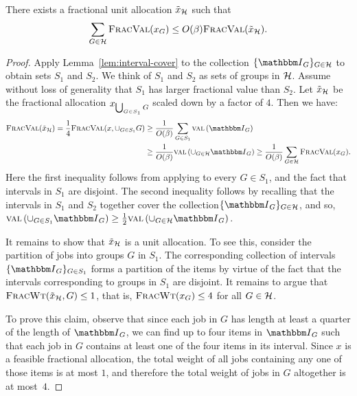 \begin{lemma}
  \label{lem:heavy-bound}
  There exists a fractional unit allocation $\tilde{x}_{\mathcal{H}}$ such that 
\[\sum_{G\in{\mathcal{H}}}{\normalfont\textsc{FracVal}}(x_G)\le O(\beta){\normalfont\textsc{FracVal}}(\tilde{x}_{\mathcal{H}}).\]
\end{lemma}
\begin{proof}
    Apply Lemma~\ref{lem:interval-cover} to the collection
    $\{\Int_G\}_{G\in\heavy}$ to obtain sets $S_1$ and $S_2$. We think of $S_1$
    and $S_2$ as sets of groups in ${\mathcal{H}}$. Assume without loss of generality
    that $S_1$ has larger fractional value than $S_2$. Let $\tilde{x}_{\mathcal{H}}$
    be the fractional allocation $x_{\bigcup_{G\in S_1} G}$ scaled down by a
    factor of $4$. Then we have:
\begin{align*}
    \fval(\tilde{x}_\heavy) = \frac 14 \fval(x, \union_{G\in S_1} G) & \ge
            \frac 1{O(\beta)} \sum_{G\in S_1} \fvI[\Int_G] \\
    & \ge \frac 1{O(\beta)} \fvI[\union_{G\in\heavy}\Int_G]\ge \frac 1{O(\beta)} \sum_{G\in\heavy}\fval(x_G).
\end{align*}
Here the first inequality follows from applying  to
every $G\in S_1$, and the fact that intervals in $S_1$ are
disjoint. The second inequality follows by recalling that the
intervals in $S_1$ and $S_2$ together cover the
collection$\{\Int_G\}_{G\in\heavy}$, and so,
$\fvI[\union_{G\in S_1}\Int_G]\ge
\half\fvI[\union_{G\in\heavy}\Int_G]$.

It remains to show that $\tilde{x}_{\mathcal{H}}$ is a unit allocation. To
see this, consider the partition of jobs into groups $G$ in $S_1$.
The corresponding collection of intervals
$\{\Int_G\}_{G\in S_1}$ forms a partition of the items by virtue of
the fact that the intervals corresponding to groups in $S_1$ are
disjoint. It remains to argue that ${\normalfont\textsc{FracWt}}(\tilde{x}_{\mathcal{H}}, G)\le 1$,
that is, ${\normalfont\textsc{FracWt}}(x_G)\le 4$ for all $G\in{\mathcal{H}}$. 

To prove this claim, observe that since each job in $G$ has length
at least a quarter of the length of $\Int_G$, we can find up to four
items in $\Int_G$ such that each job in $G$ contains at least one of
the four items in its interval. Since $x$ is a feasible fractional
allocation, the total weight of all jobs containing any one of those
items is at most $1$, and therefore the total weight of jobs in
$G$ altogether is at most~$4$.
\end{proof}

